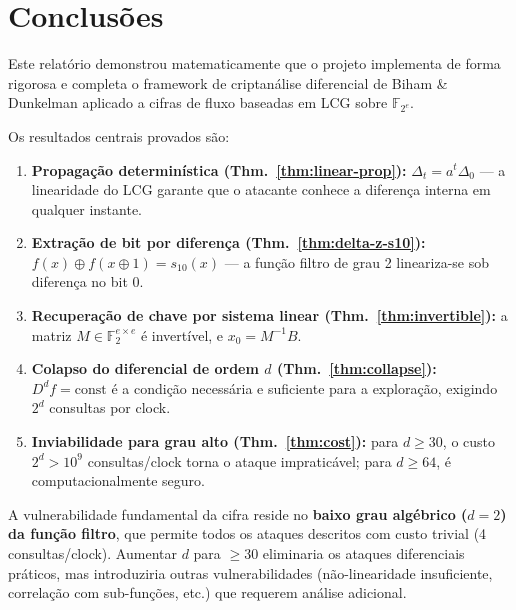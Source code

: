\documentclass[12pt,a4paper]{article}
\theoremstyle{definition}
\theoremstyle{remark}
\newcommand{\GF}[1]{\mathbb{F}_{2^{#1}}}
\newcommand{\GFtwo}{\mathbb{F}_2}
\newcommand{\xor}{\oplus}
\newcommand{\filter}{f}
\begin{document}
\section{Conclusões}
\label{sec:conclusion}

Este relatório demonstrou matematicamente que o projeto implementa de forma
rigorosa e completa o framework de criptanálise diferencial de Biham \&
Dunkelman aplicado a cifras de fluxo baseadas em LCG sobre $\GF{e}$.

Os resultados centrais provados são:

\begin{enumerate}[label=(\roman*)]
  \item \textbf{Propagação determinística (Thm.~\ref{thm:linear-prop}):}
        $\Delta_t = a^t \Delta_0$ — a linearidade do LCG garante que o
        atacante conhece a diferença interna em qualquer instante.

  \item \textbf{Extração de bit por diferença (Thm.~\ref{thm:delta-z-s10}):}
        $\filter(x) \xor \filter(x \xor 1) = s_{10}(x)$ — a função filtro
        de grau 2 lineariza-se sob diferença no bit 0.

  \item \textbf{Recuperação de chave por sistema linear (Thm.~\ref{thm:invertible}):}
        a matriz $M \in \GFtwo^{e \times e}$ é invertível, e $x_0 = M^{-1}B$.

  \item \textbf{Colapso do diferencial de ordem $d$ (Thm.~\ref{thm:collapse}):}
        $D^d f = \text{const}$ é a condição necessária e suficiente para a
        exploração, exigindo $2^d$ consultas por clock.

  \item \textbf{Inviabilidade para grau alto (Thm.~\ref{thm:cost}):}
        para $d \geq 30$, o custo $2^d > 10^9$ consultas/clock torna o ataque
        impraticável; para $d \geq 64$, é computacionalmente seguro.
\end{enumerate}

A vulnerabilidade fundamental da cifra reside no \textbf{baixo grau algébrico
($d=2$) da função filtro}, que permite todos os ataques descritos com custo
trivial (4 consultas/clock). Aumentar $d$ para $\geq 30$ eliminaria os ataques
diferenciais práticos, mas introduziria outras vulnerabilidades (não-linearidade
insuficiente, correlação com sub-funções, etc.) que requerem análise adicional.
\end{document}
